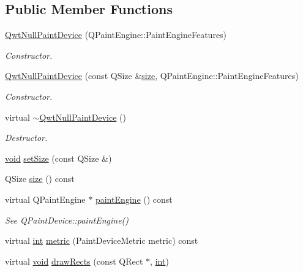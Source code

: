 \subsection*{Public Member Functions}
\begin{DoxyCompactItemize}
\item 
\hyperlink{class_qwt_null_paint_device_a030b11a6fac49dc73ca10619b04ab184}{Qwt\-Null\-Paint\-Device} (Q\-Paint\-Engine\-::\-Paint\-Engine\-Features)
\begin{DoxyCompactList}\small\item\em Constructor. \end{DoxyCompactList}\item 
\hyperlink{class_qwt_null_paint_device_ac21a4d30812701e9c9bf9f4cc2a29a5f}{Qwt\-Null\-Paint\-Device} (const Q\-Size \&\hyperlink{glext_8h_a014d89bd76f74ef3a29c8f04b473eb76}{size}, Q\-Paint\-Engine\-::\-Paint\-Engine\-Features)
\begin{DoxyCompactList}\small\item\em Constructor. \end{DoxyCompactList}\item 
virtual \hyperlink{class_qwt_null_paint_device_a050e40b6efff32a616f3e8326f4fd632}{$\sim$\-Qwt\-Null\-Paint\-Device} ()
\begin{DoxyCompactList}\small\item\em Destructor. \end{DoxyCompactList}\item 
\hyperlink{group___u_a_v_objects_plugin_ga444cf2ff3f0ecbe028adce838d373f5c}{void} \hyperlink{class_qwt_null_paint_device_a107a1ac9d9a87dcf263d595009335904}{set\-Size} (const Q\-Size \&)
\item 
Q\-Size \hyperlink{class_qwt_null_paint_device_afd678a71f5f317955cb94f6e6f7e9d66}{size} () const 
\item 
virtual Q\-Paint\-Engine $\ast$ \hyperlink{class_qwt_null_paint_device_a2058b09c918ed674ef1977d11d869b03}{paint\-Engine} () const 
\begin{DoxyCompactList}\small\item\em See Q\-Paint\-Device\-::paint\-Engine() \end{DoxyCompactList}\item 
virtual \hyperlink{ioapi_8h_a787fa3cf048117ba7123753c1e74fcd6}{int} \hyperlink{class_qwt_null_paint_device_a014f8bf4ba5f58df3d17747e09d8f539}{metric} (Paint\-Device\-Metric metric) const 
\item 
virtual \hyperlink{group___u_a_v_objects_plugin_ga444cf2ff3f0ecbe028adce838d373f5c}{void} \hyperlink{class_qwt_null_paint_device_a1ea5ece663be08bacd9b1b46230b5cbc}{draw\-Rects} (const Q\-Rect $\ast$, \hyperlink{ioapi_8h_a787fa3cf048117ba7123753c1e74fcd6}{int})

\end{DoxyCompactItemize}

